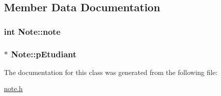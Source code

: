 \subsection{Member Data Documentation}
\hypertarget{class_note_a3cb5f22dd5374f4e3c59c5f11dc7fbfb}{
\subsubsection[{note}]{\setlength{\rightskip}{0pt plus 5cm}int Note\+::note\hspace{0.3cm}{\ttfamily [private]}}}\label{class_note_a3cb5f22dd5374f4e3c59c5f11dc7fbfb}
\hypertarget{class_note_a3ceec90c97d49215fe0eaa33e92a83d2}{
\subsubsection[{p\+Etudiant}]{$\ast$ Note\+::p\+Etudiant\hspace{0.3cm}{\ttfamily [private]}}}\label{class_note_a3ceec90c97d49215fe0eaa33e92a83d2}


The documentation for this class was generated from the following file\+:\begin{DoxyCompactItemize}
\item 
\hyperlink{note_8h}{note.\+h}\end{DoxyCompactItemize}
